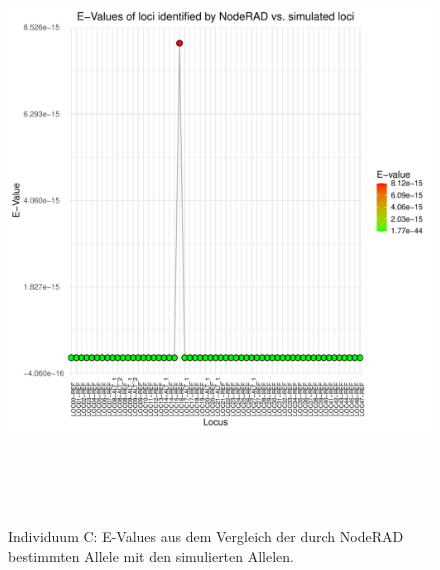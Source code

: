 \begin{figure}[H]
	\begin{center}
		\includegraphics[height=16cm]{bilder/evaluation/evalues/C.plot_evalues.pdf}
		\caption{Individuum C: E-Values aus dem Vergleich der durch NodeRAD bestimmten Allele mit den simulierten Allelen.}
	\end{center}
\end{figure}

